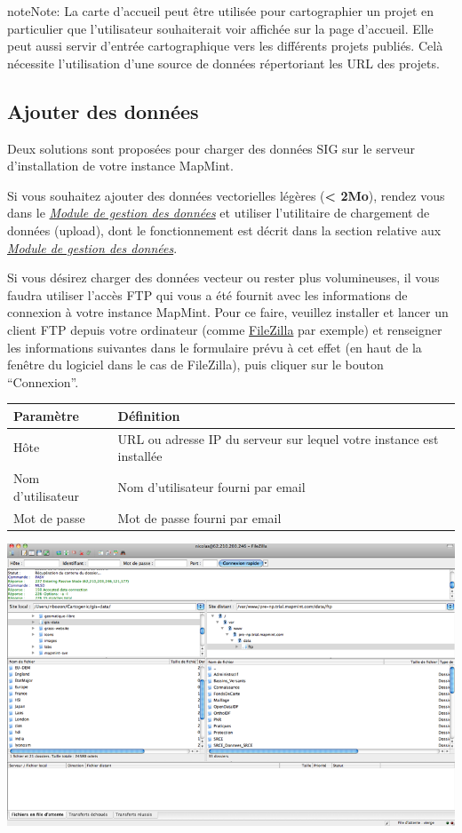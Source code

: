 \documentclass[letterpaper,10pt,french]{sphinxmanual}
\begin{document}
\begin{notice}{note}{Note:}
La carte d'accueil peut être utilisée pour cartographier un projet en particulier que l'utilisateur souhaiterait voir affichée sur la page d'accueil. Elle peut aussi servir d'entrée cartographique vers les différents projets publiés. Celà nécessite l'utilisation d'une source de données répertoriant les URL des projets.
\end{notice}


\subsection{Ajouter des données}
\label{introduction/usemapmint:ajouter-des-donnees}
Deux solutions sont proposées pour charger des données SIG sur le serveur d'installation de votre instance MapMint.

Si vous souhaitez ajouter des données vectorielles légères (\textbf{\textless{} 2Mo}), rendez vous dans le {\hyperref[data/index::doc]{\emph{\emph{Module de gestion des données}}}} et utiliser l'utilitaire de chargement de données (upload), dont le fonctionnement est décrit dans la section relative aux {\hyperref[data/index::doc]{\emph{\emph{Module de gestion des données}}}}.

Si vous désirez charger des données vecteur ou rester plus volumineuses, il vous faudra utiliser l'accès FTP qui vous a été fournit avec les informations de connexion à votre instance MapMint. Pour ce faire, veuillez installer et lancer un client FTP depuis votre ordinateur (comme \href{https://filezilla-project.org/}{FileZilla} par exemple) et renseigner les informations suivantes dans le formulaire prévu à cet effet (en haut de la fenêtre du logiciel dans le cas de FileZilla), puis cliquer sur le bouton ``Connexion''.

\begin{tabulary}{\linewidth}{|L|L|}
\hline

\textbf{Paramètre}
 & 
\textbf{Définition}
\\
\hline
Hôte
 & 
URL ou adresse IP du serveur sur lequel votre instance est installée
\\
\hline
Nom d'utilisateur
 & 
Nom d'utilisateur fourni par email
\\
\hline
Mot de passe
 & 
Mot de passe fourni par email
\\
\hline\end{tabulary}


\includegraphics{upload-ftp.png}
\end{document}

